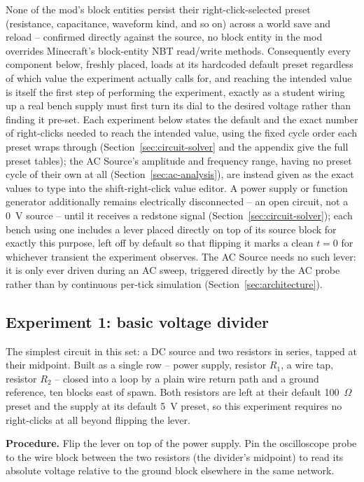 None of the mod's block entities persist their right-click-selected preset (resistance,
capacitance, waveform kind, and so on) across a world save and reload -- confirmed directly
against the source, no block entity in the mod overrides Minecraft's block-entity NBT
read/write methods. Consequently every component below, freshly placed, loads at its
hardcoded default preset regardless of which value the experiment actually calls for, and
reaching the intended value is itself the first step of performing the experiment, exactly
as a student wiring up a real bench supply must first turn its dial to the desired voltage
rather than finding it pre-set. Each experiment below states the default and the exact
number of right-clicks needed to reach the intended value, using the fixed cycle order each
preset wraps through (Section~\ref{sec:circuit-solver} and the appendix give the full preset
tables); the AC Source's amplitude and frequency range, having no preset cycle of their own
at all (Section~\ref{sec:ac-analysis}), are instead given as the exact values to type into
the shift-right-click value editor. A power supply or function generator additionally
remains electrically disconnected -- an open circuit, not a 0~V source -- until it receives
a redstone signal (Section~\ref{sec:circuit-solver}); each bench using one includes a lever
placed directly on top of its source block for exactly this purpose, left off by default so
that flipping it marks a clean $t=0$ for whichever transient the experiment observes. The AC
Source needs no such lever: it is only ever driven during an AC sweep, triggered directly by
the AC probe rather than by continuous per-tick simulation (Section~\ref{sec:architecture}).

\subsection{Experiment 1: basic voltage divider}
\label{sec:exp-divider}

The simplest circuit in this set: a DC source and two resistors in series, tapped at their
midpoint. Built as a single row -- power supply, resistor $R_1$, a wire tap, resistor $R_2$
-- closed into a loop by a plain wire return path and a ground reference, ten blocks east of
spawn. Both resistors are left at their default 100~$\Omega$ preset and the supply at its
default 5~V preset, so this experiment requires no right-clicks at all beyond flipping the
lever.

\textbf{Procedure.} Flip the lever on top of the power supply. Pin the oscilloscope probe to
the wire block between the two resistors (the divider's midpoint) to read its absolute
voltage relative to the ground block elsewhere in the same network.

